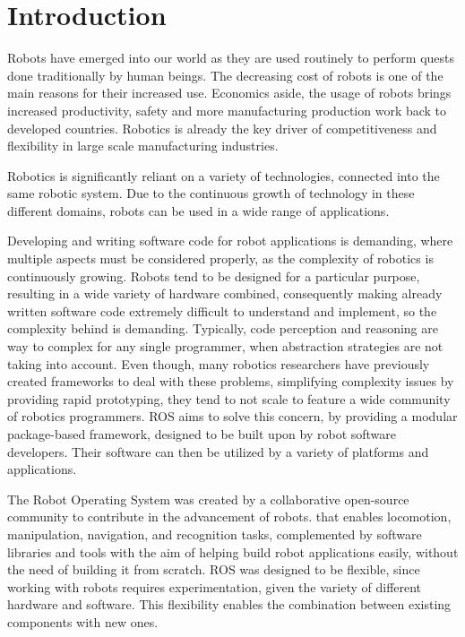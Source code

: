 \chapter{Introduction}\label{c:intro}

Robots have emerged into our world as they are used routinely to perform quests done traditionally by human beings. The decreasing cost of robots is one of the main reasons for their increased use.\cite{craig2005introduction} Economics aside, the usage of robots brings increased productivity, safety and more manufacturing production work back to developed countries.\cite{robots-importance} Robotics is already the key driver of competitiveness and flexibility in large scale manufacturing industries.\cite{robots-everyday-life} 

Robotics is significantly reliant on a variety of technologies, connected into the same robotic system. Due to the continuous growth of technology in these different domains, robots can be used in a wide range of applications.\cite{mohamed2008middleware}

Developing and writing software code for robot applications is demanding, where multiple aspects must be considered properly, as the complexity of robotics is continuously growing. Robots tend to be designed for a particular purpose, resulting in a wide variety of hardware combined, consequently making already written software code extremely difficult to understand and implement, so the complexity behind is demanding. Typically, code perception and reasoning are way to complex for any single programmer, when abstraction strategies are not taking into account. Even though, many robotics researchers have previously created frameworks to deal with these problems, simplifying complexity issues by providing rapid prototyping, they tend to not scale to feature a wide community of robotics programmers. ROS aims to solve this concern, by providing a modular package-based framework, designed to be built upon by robot software developers. Their software can then be utilized by a variety of platforms and applications.\cite{intro-ros}

The Robot Operating System was created by a collaborative open-source community to contribute in the advancement of robots.\cite{diluoffo2018robot} that enables locomotion, manipulation, navigation, and recognition tasks, complemented by software libraries and tools with the aim of helping build robot applications easily, without the need of building it from scratch. ROS was designed to be flexible, since working with robots requires experimentation, given the variety of different hardware and software. This flexibility enables the combination between existing components with new ones. 



